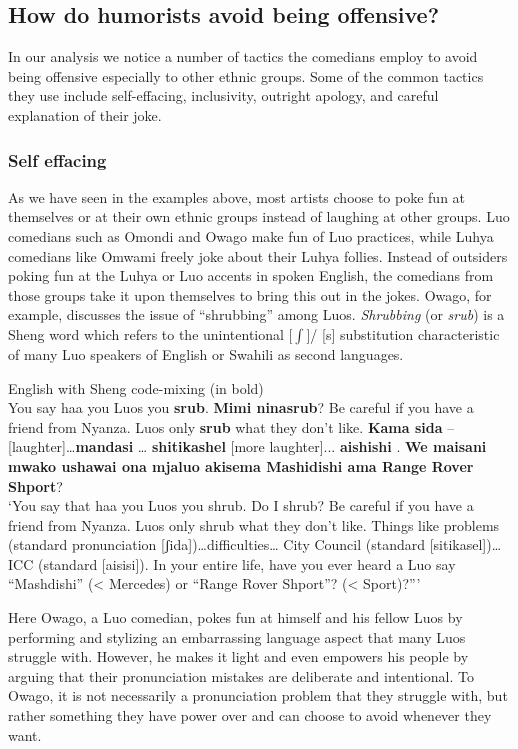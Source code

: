 \documentclass[output=paper]{langsci/langscibook}
\begin{document}
\subsection{How do humorists avoid being offensive? }

In our analysis we notice a number of tactics the comedians employ to avoid being offensive especially to other ethnic groups. Some of the common tactics they use include self-effacing, inclusivity, outright apology, and careful explanation of their joke.

\subsubsection{Self effacing}

As we have seen in the examples above, most artists choose to poke fun at themselves or at their own ethnic groups instead of laughing at other groups. Luo comedians such as Omondi and Owago make fun of Luo practices, while Luhya comedians like Omwami freely joke about their Luhya follies. Instead of outsiders poking fun at the Luhya or Luo accents in spoken English, the comedians from those groups take it upon themselves to bring this out in the jokes. Owago, for example, discusses the issue of “shrubbing” among Luos. \textit{Shrubbing} (or \textit{srub}) is a Sheng word which refers to the unintentional [${\int}$]/ [s] substitution characteristic of many Luo speakers of English or Swahili as second languages.

\ea
{English with Sheng code-mixing (in bold)}\\
 You say haa you Luos you \textbf{srub}. \textbf{Mimi ninasrub}? Be careful if you have a friend from Nyanza. Luos only \textbf{srub} what they don’t like. \textbf{Kama sida} –\textup{[laughter]}…\textbf{mandasi} … \textbf{shitikashel} \textup{[more laughter]}... \textbf{aishishi} . \textbf{We maisani mwako ushawai ona mjaluo akisema Mashidishi ama Range Rover Shport}?\\
‘You say that haa you Luos you shrub. Do I shrub? Be careful if you have a friend from Nyanza. Luos only shrub what they don’t like. Things like problems (standard pronunciation [ʃida])…difficulties… City Council (standard [sitikasel])… ICC (standard [aisisi]). In your entire life, have you ever heard a Luo say “Mashdishi” (< Mercedes) or “Range Rover Shport”? (< Sport)?”’ \citep{Churchill2013c}
\z

Here Owago, a Luo comedian, pokes fun at himself and his fellow Luos by performing and stylizing an embarrassing language aspect that many Luos struggle with. However, he makes it light and even empowers his people by arguing that their pronunciation mistakes are deliberate and intentional. To Owago, it is not necessarily a pronunciation problem that they struggle with, but rather something they have power over and can choose to avoid whenever they want.
\end{document}
